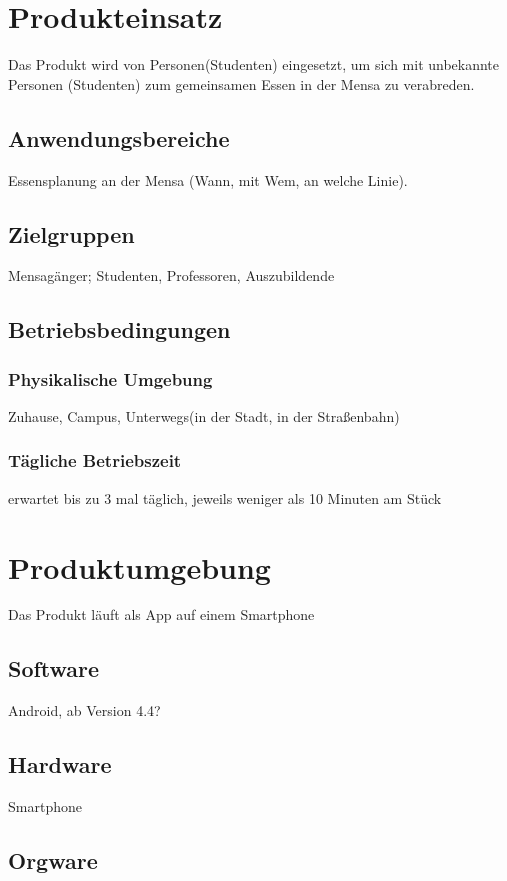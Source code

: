 \documentclass[a4paper]{scrreprt}
\begin{document}
\chapter{Produkteinsatz}
Das Produkt wird von Personen(Studenten) eingesetzt, um sich mit unbekannte Personen (Studenten) zum gemeinsamen Essen in der Mensa zu verabreden.

 
\section{Anwendungsbereiche}
Essensplanung an der Mensa (Wann, mit Wem, an welche Linie).
 
\section{Zielgruppen}
Mensagänger; Studenten, Professoren, Auszubildende 
 
\section{Betriebsbedingungen}
\subsection{Physikalische Umgebung}
Zuhause, Campus, Unterwegs(in der Stadt, in der Straßenbahn)

\subsection{Tägliche Betriebszeit}
erwartet bis zu 3 mal täglich, jeweils weniger als 10 Minuten am Stück 
 
\chapter{Produktumgebung}
Das Produkt läuft als App auf einem Smartphone

\section{Software}
Android, ab Version 4.4?
 
\section{Hardware}
Smartphone 
 
\section{Orgware}
\end{document}
